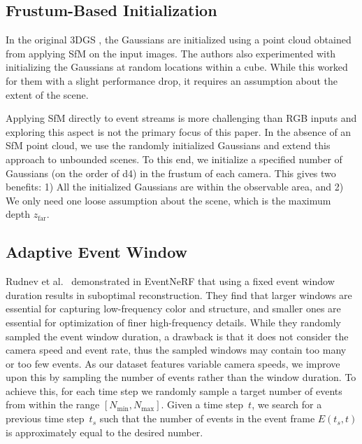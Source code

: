 \subsection{Frustum-Based Initialization}
\label{sec:frustum_init}

In the original 3DGS \cite{3dgs}, the Gaussians are initialized using a point cloud obtained from applying SfM on the input images. 
The authors also experimented with initializing the Gaussians at random locations within a cube. While this worked for them with a slight performance drop, it requires an assumption about the extent of the scene. 

Applying SfM directly to event streams is more challenging than RGB inputs \cite{Kim2016} and exploring this aspect is not the primary focus of this paper. 
In the absence of an SfM point cloud, we use the randomly initialized Gaussians and extend this approach to unbounded scenes. 
To this end, we initialize a specified number of Gaussians (on the order of \qty{d4}{}) in the frustum of each camera. 
This gives two benefits: 1) All the initialized Gaussians are within the observable area, and 2) We only need one loose assumption about the scene, which is the maximum depth $z_\mathrm{far}$. 


\subsection{Adaptive Event Window}\label{subsec:adaptive_window}

Rudnev et al.~\cite{eventnerf} demonstrated in EventNeRF that using a fixed event window duration results in suboptimal reconstruction. They find that larger windows are essential for capturing low-frequency color and structure, and smaller ones are essential for optimization of finer high-frequency details. While they randomly sampled the event window duration, a drawback is that it does not consider the camera speed and event rate, thus the sampled windows may contain too many or too few events.  
As our dataset features variable camera speeds, we improve upon this by sampling the number of events rather than the window duration.  
To achieve this, for each time step we randomly sample a target number of events from within the range $[N_\mathrm{min}, N_\mathrm{max}]$. 
Given a time step~$t$, we search for a previous time step~$t_s$ such that the number of events in the event frame $E(t_s, t)$ is approximately equal to the desired number. 

